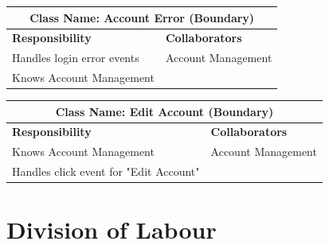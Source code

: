 \documentclass[]{article}
\begin{document}
\begin{table}[H]
  \centering
  \renewcommand{\arraystretch}{1.3} %
  \begin{tabular}{|p{7.5cm}|p{7.5cm}|}
    \hline
    \multicolumn{2}{|c|}{\textbf{Class Name: Account Error (Boundary)}} \\
    \hline
    \textbf{Responsibility}    & \textbf{Collaborators}                 \\
    \hline
    Handles login error events & Account Management                     \\
    Knows Account Management   &                                        \\
    \hline
  \end{tabular}
  \label{tab:crc_card}
\end{table}

\begin{table}[H]
  \centering
  \renewcommand{\arraystretch}{1.3} %
  \begin{tabular}{|p{7.5cm}|p{7.5cm}|}
    \hline
    \multicolumn{2}{|c|}{\textbf{Class Name: Edit Account (Boundary)}} \\
    \hline
    \textbf{Responsibility}                & \textbf{Collaborators}    \\
    \hline
    Knows Account Management               & Account Management        \\
    Handles click event for "Edit Account" &                           \\
    \hline
  \end{tabular}
  \label{tab:crc_card}
\end{table}


\pagebreak

\appendix
\section{Division of Labour}
\label{sec:division_of_labour}
\end{document}
